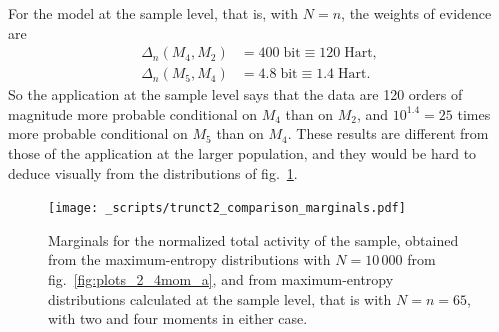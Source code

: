 \documentclass[\ifafour a4paper,12pt,\else a5paper,10pt,\fi%
onecolumn,oneside,article,%
british%
]{memoir}
\theoremstyle{remark}
\theoremstyle{innote}
\renewcommand*{\|}{\nonscript\,\vert\nonscript\;\mathopen{}}
\newcommand*{\fig}{fig.}%
\newcommand*{\ydi}{\varDelta}
\newcommand*{\bit}{\textrm{bit}}
\newcommand*{\hart}{\textrm{Hart}}
\begin{document}
For the model at the sample level, that is, with $N=n$, the weights of
evidence are
\begin{equation}
  \label{eq:diff_suff_n}
  \begin{split}
  \ydi_{n}(M_{4},M_{2}) &= 400\;\bit \equiv 120\;\hart,
\\    \ydi_{n}(M_{5},M_{4}) &= 4.8\;\bit \equiv 1.4\;\hart.
\end{split}
\end{equation}
So the application at the sample level says that the data are 120 orders of
magnitude more probable conditional on $M_{4}$ than on $M_{2}$, and
$10^{1.4}=25$ times more probable conditional on $M_{5}$ than on $M_{4}$.
These results are different from those of the application at the larger
population, and they would be hard to deduce visually from the
distributions of \fig~\ref{fig:comparisons_marginals}.



\begin{figure}[!p]
\centering
\texttt{[image: \_scripts/trunct2\_comparison\_marginals.pdf]}%
\caption{Marginals for the normalized total activity of the sample,
  obtained from the maximum-entropy distributions with $N=10\,000$ from
  \fig~\ref{fig:plots_2_4mom_a}, and from maximum-entropy distributions
  calculated at the sample level, that is with $N=n=65$, with two and four
  moments in either case.}
\label{fig:comparisons_marginals}
\end{figure}

\medskip

\end{document}
